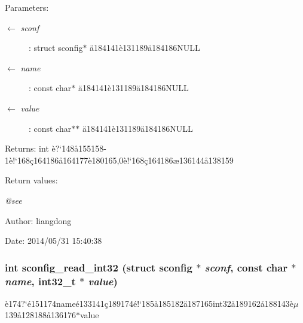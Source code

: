 \begin{Desc}
\item[Parameters:]
\begin{description}
\item[\mbox{$\leftarrow$} {\em sconf}]: struct sconfig$\ast$ \"{a}184141\`{e}131189\"{a}184186NULL \item[\mbox{$\leftarrow$} {\em name}]: const char$\ast$ \"{a}184141\`{e}131189\"{a}184186NULL \item[\mbox{$\leftarrow$} {\em value}]: const char$\ast$$\ast$ \"{a}184141\`{e}131189\"{a}184186NULL \end{description}
\end{Desc}
\begin{Desc}
\item[Returns:]int \`{e}?`148\aa{}155158-1\`{e}!`168\c{c}164186\aa{}164177\`{e}180165,0\`{e}!`168\c{c}164186\ae{}136144\aa{}138159 \end{Desc}
\begin{Desc}
\item[Return values:]
\begin{description}
\item[{\em @see}]\end{description}
\end{Desc}
\begin{Desc}
\item[Author:]liangdong \end{Desc}
\begin{Desc}
\item[Date:]2014/05/31 15:40:38 \end{Desc}
\subsubsection{\setlength{\rightskip}{0pt plus 5cm}int sconfig\_\-read\_\-int32 (struct sconfig $\ast$ {\em sconf}, const char $\ast$ {\em name}, int32\_\-t $\ast$ {\em value})}\label{sconfig_8c_a7}


\`{e}174?`\'{e}151174name\'{e}133141\c{c}189174\'{e}!`185\aa{}185182\"{a}187165int32\aa{}189162\aa{}188143\`{e}$\mu$139\aa{}128188\aa{}136176$\ast$value 

